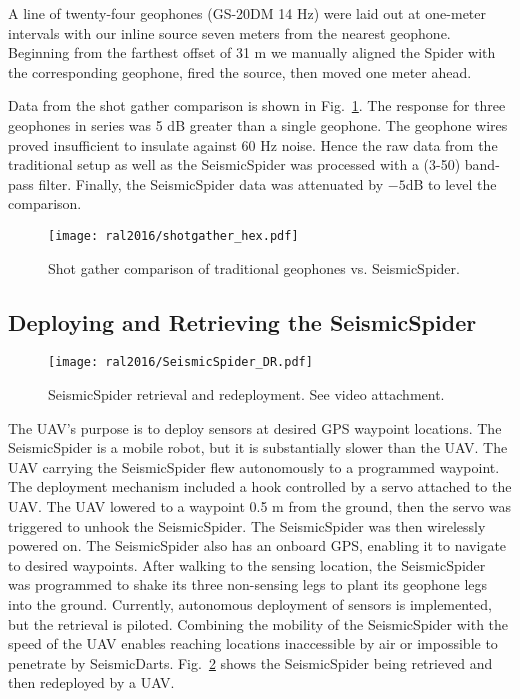 A line of twenty-four geophones (GS-20DM 14 Hz) were laid out at one-meter intervals with our inline source seven meters from the nearest geophone.
Beginning from the farthest offset of 31 m we manually aligned the Spider with the corresponding geophone, fired the source, then moved one meter ahead.

Data from the shot gather comparison is shown in Fig.~\ref{fig:shotgatherHexpod}.
The response for three geophones in series was 5 dB greater than a single geophone.
The geophone wires proved insufficient to insulate against 60 Hz noise.
Hence the raw data from the traditional setup as well as the SeismicSpider was processed with a (3-50) band-pass filter.
Finally, the SeismicSpider data was attenuated by $-5$dB to level the comparison.

\begin{figure} \centering
	\texttt{[image: ral2016/shotgather\_hex.pdf]}
	\caption{Shot gather comparison of traditional geophones vs. SeismicSpider.
	\label{fig:shotgatherHexpod}}
\end{figure}

\subsection{Deploying and Retrieving the SeismicSpider}

\begin{figure} \centering
	\texttt{[image: ral2016/SeismicSpider\_DR.pdf]}
	\caption{SeismicSpider retrieval and redeployment. See video attachment.
	\label{fig:SeismicSpiderDR}}
\end{figure}

The UAV's purpose is to deploy sensors at desired GPS waypoint locations.
The SeismicSpider is a mobile robot, but it is substantially slower than the UAV.
The UAV carrying the SeismicSpider flew autonomously to a programmed waypoint.
The deployment mechanism included a hook controlled by a servo attached to the UAV.
The UAV lowered to a waypoint 0.5 m from the ground, then the servo was triggered to unhook the SeismicSpider.
The SeismicSpider was then wirelessly powered on.
The SeismicSpider also has an onboard GPS, enabling it to navigate to desired waypoints.
After walking to the sensing location, the SeismicSpider was programmed to shake its three non-sensing legs to plant its geophone legs into the ground.
Currently, autonomous deployment of sensors is implemented, but the retrieval is piloted.
Combining the mobility of the SeismicSpider with the speed of the UAV enables reaching locations inaccessible by air or impossible to penetrate by SeismicDarts.
Fig.~\ref{fig:SeismicSpiderDR} shows the SeismicSpider being retrieved and then redeployed by a UAV.

